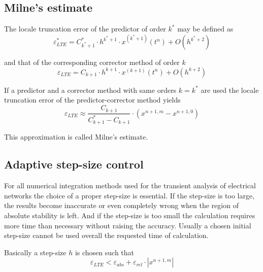 \subsection{Milne's estimate}

The locale truncation error of the predictor of order $k^{*}$ may be
defined as
\begin{equation}
\varepsilon^{*}_{LTE} = C^{*}_{k^{*}+1}\cdot h^{k^{*}+1}\cdot x^{(k^{*}+1)}\left(t^n\right) + O\left(h^{k^{*}+2}\right)
\end{equation}

and that of the corresponding corrector method of order $k$
\begin{equation}
\varepsilon_{LTE} = C_{k+1}\cdot h^{k+1}\cdot x^{(k+1)}\left(t^n\right) + O\left(h^{k+2}\right)
\end{equation}

If a predictor and a corrector method with same orders $k = k^{*}$ are
used the locale truncation error of the predictor-corrector method
yields
\begin{equation}
\varepsilon_{LTE} \approx \dfrac{C_{k+1}}{C^{*}_{k+1} - C_{k+1}}\cdot \left(x^{n+1, m} - x^{n+1, 0}\right)
\end{equation}

This approximation is called Milne's estimate.

\subsection{Adaptive step-size control}

For all numerical integration methods used for the transient analysis
of electrical networks the choice of a proper step-size is essential.
If the step-size is too large, the results become inaccurate or even
completely wrong when the region of absolute stability is left.  And
if the step-size is too small the calculation requires more time than
necessary without raising the accuracy.  Usually a chosen initial
step-size cannot be used overall the requested time of calculation.

\addvspace{12pt}

Basically a step-size $h$ is chosen such that
\begin{equation}
\varepsilon_{LTE} < \varepsilon_{abs} + \varepsilon_{rel}\cdot \left|x^{n+1,m}\right|
\end{equation}

